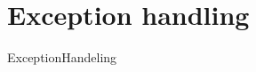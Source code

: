 \chapter{Exception handling} \label{ch:ExceptionHandaling}


\graphicspath{{Chapters/ExceptionHandaling/Figures/}}






ExceptionHandeling